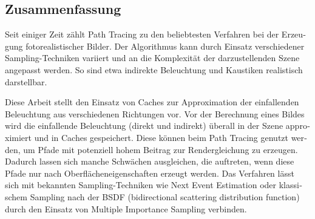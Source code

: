 \begin{center}
\begin{minipage}{0.7\textwidth}


\chapter*{Zusammenfassung}
\begin{otherlanguage}{ngerman}
Seit einiger Zeit zählt Path Tracing zu den beliebtesten Verfahren bei der Erzeugung fotorealistischer Bilder. Der Algorithmus kann durch Einsatz verschiedener Sampling-Techniken variiert und an die Komplexität der darzustellenden Szene angepasst werden. So sind etwa indirekte Beleuchtung und Kaustiken realistisch darstellbar.

Diese Arbeit stellt den Einsatz von Caches zur Approximation der einfallenden Beleuchtung aus verschiedenen Richtungen vor. Vor der Berechnung eines Bildes wird die einfallende Beleuchtung (direkt und indirekt) überall in der Szene approximiert und in Caches gespeichert. Diese können beim Path Tracing genutzt werden, um Pfade mit potenziell hohem Beitrag zur Rendergleichung zu erzeugen.\newline
Dadurch lassen sich manche Schwächen ausgleichen, die auftreten, wenn diese Pfade nur nach Oberflächeneigenschaften erzeugt werden. Das Verfahren lässt sich mit bekannten Sampling-Techniken wie Next Event Estimation oder klassischem Sampling nach der BSDF (bidirectional scattering distribution function) durch den Einsatz von Multiple Importance Sampling verbinden.

\end{otherlanguage}

\end{minipage}
\end{center}
